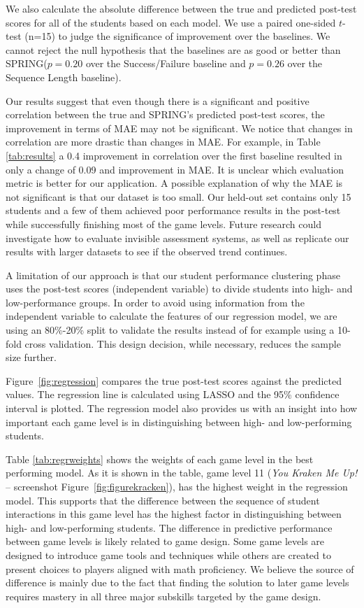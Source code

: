 \documentclass{sigchi}
\def\algname{SPRING\xspace}
\begin{document}
	We also calculate the absolute difference between the true and predicted post-test scores for all of the students based on each model.
	We use a paired one-sided $t$-test (n=15) to judge the significance of improvement over the baselines.
	We cannot reject the null hypothesis that the baselines are as good or better than  \algname ($p=0.20$ over the Success/Failure baseline and $p=0.26$ over the Sequence Length baseline).
	
	Our results suggest that even though there is a significant and positive correlation between the true and \algname's predicted post-test scores, the improvement in terms of MAE  may not be significant. 	
	We notice that changes in correlation are more drastic than changes in MAE.
	For example, in Table \ref{tab:results}  a 0.4 improvement in correlation over the first baseline resulted in only a change of 0.09 and  improvement in MAE.
	It is unclear which evaluation metric is better for our application.
	 A possible explanation
of why the MAE is not significant is that our dataset is too
small. 
Our held-out set contains only 15 students and a few of
them achieved poor performance results in the post-test while
successfully finishing most of the game levels. 
	Future research could investigate how to evaluate invisible assessment systems, as well as replicate our results with larger datasets to see if the observed trend continues.

A limitation
of our approach is that our student performance clustering
phase uses the post-test scores (independent variable) to divide
students into high- and low-performance groups.
In order
to avoid using information from the independent variable to
calculate the features of our regression model, we are using an
80\%-20\% split to validate the results instead of for example
using a 10-fold cross validation. This design decision, while
necessary, reduces the sample size further.

	
	
	Figure~\ref{fig:regression} compares the true post-test scores against the predicted values.
	The regression line is calculated using LASSO and the 95\% confidence interval is plotted.
	The regression model also provides us with an insight into how important each game level is in distinguishing between high- and low-performing students.
	
	Table \ref{tab:regrweights} shows the weights of each game level in the best performing model.
	As it is shown in the table, game level 11 (\textit{You Kraken Me Up!} -- screenshot Figure~\ref{fig:figurekracken}), has the highest weight in the regression model. 
	This supports that the difference between the sequence of student interactions in this game level has the highest factor in distinguishing between high- and low-performing students. 	The difference in predictive performance between game levels is likely related to game design. 
	Some game levels are designed to introduce game tools and techniques while others are created to present choices to players aligned with math proficiency.
	We believe the source of difference is mainly due to the fact that finding the solution to later game levels requires mastery in all three major subskills targeted by the game design.	
\end{document}
